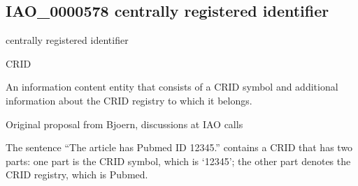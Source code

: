 \documentclass[letterpaper,10pt,english]{sphinxmanual}
\begin{document}
\subsection{IAO\_0000578 \sphinxhyphen{} centrally registered identifier}
\label{\detokenize{doc-IAO_0000578:iao-0000578-centrally-registered-identifier}}\label{\detokenize{doc-IAO_0000578:index-0}}\label{\detokenize{doc-IAO_0000578::doc}}
\begin{sphinxShadowBox}

\sphinxAtStartPar
centrally registered identifier
\end{sphinxShadowBox}

\begin{sphinxShadowBox}

\sphinxAtStartPar
CRID
\end{sphinxShadowBox}

\begin{sphinxShadowBox}

\sphinxAtStartPar
{\hyperref[\detokenize{doc-IAO_0020000::doc}]{}}
\end{sphinxShadowBox}

\begin{sphinxShadowBox}

\sphinxAtStartPar
An information content entity that consists of a CRID symbol and additional information about the CRID registry to which it belongs.
\end{sphinxShadowBox}

\begin{sphinxShadowBox}

\sphinxAtStartPar
Original proposal from Bjoern, discussions at IAO calls
\end{sphinxShadowBox}

\begin{sphinxShadowBox}

\sphinxAtStartPar
The sentence “The article has Pubmed ID 12345.” contains a CRID that has two parts: one part is the CRID symbol, which is ‘12345’; the other part denotes the CRID registry, which is Pubmed.
\end{sphinxShadowBox}
\end{document}
